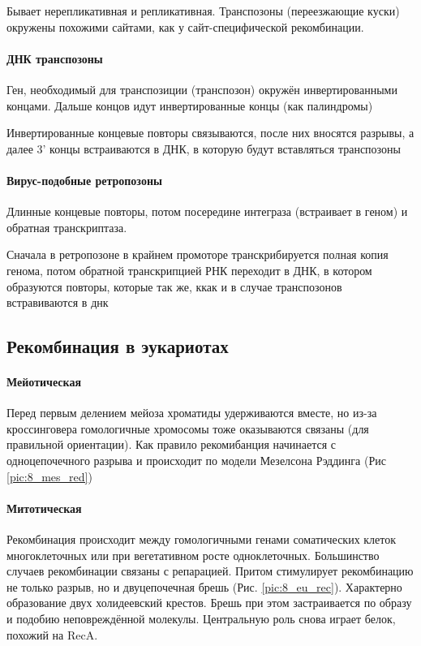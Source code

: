 Бывает нерепликативная и репликативная. Транспозоны (переезжающие куски) окружены похожими сайтами, как у сайт-специфической рекомбинации. 

\paragraph{ДНК транспозоны} Ген, необходимый для транспозиции (транспозон) окружён инвертированными концами. Дальше концов идут инвертированные концы (как палиндромы)

Инвертированные концевые повторы связываются, после них вносятся разрывы, а далее 3' концы встраиваются в ДНК, в которую будут вставляться транспозоны
 \begin{figure}[H]
\end{figure}
\paragraph{Вирус-подобные ретропозоны} Длинные концевые повторы, потом посередине интеграза (встраивает в геном) и обратная транскриптаза. 

Сначала в ретропозоне в крайнем промоторе транскрибируется полная копия генома, потом обратной транскрипцией РНК переходит в ДНК, в котором образуются повторы, которые так же, ккак и в случае транспозонов встравиваются в днк
\subsection{Рекомбинация в эукариотах}
\paragraph{Мейотическая}
Перед первым делением мейоза хроматиды удерживаются вместе, но из-за кроссинговера гомологичные хромосомы тоже оказываются связаны (для правильной ориентации). Как правило рекомибанция начинается с одноцепочечного разрыва и происходит по модели Мезелсона Рэддинга (Рис \ref{pic:8_mes_red})
 \begin{figure}[H]
\end{figure}
\paragraph{Митотическая}
Рекомбинация происходит между гомологичными генами соматических клеток многоклеточных или при вегетативном росте одноклеточных. Большинство случаев рекомбинации связаны с репарацией. Притом стимулирует рекомбинацию не только разрыв, но и двуцепочечная брешь (Рис. \ref{pic:8_eu_rec}). Характерно образование двух холидеевский крестов. Брешь при этом застраивается по образу и подобию неповреждённой молекулы. Центральную роль снова играет белок, похожий на RecA.
 \begin{figure}[H]
\end{figure}
